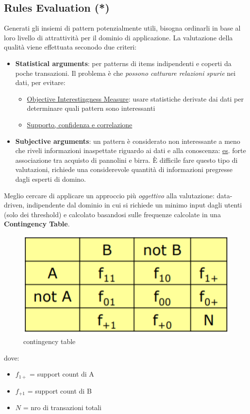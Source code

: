\subsection{Rules Evaluation (*)}
Generati gli insiemi di pattern potenzialmente utili, bisogna ordinarli in base al loro livello di attrattività per il dominio di applicazione. La valutazione della qualità viene effettuata seconodo due criteri:
\begin{itemize}
	\item \textbf{Statistical arguments}: per patterns di items indipendenti e coperti da poche transazioni. Il problema è che \textit{possono catturare relazioni spurie} nei dati, per evitare:
	\begin{itemize}
		\item \underline{Objective Interestingness Measure}: usare statistiche derivate dai dati per determinare quali pattern sono interessanti
		\item \underline{Supporto, confidenza e correlazione}
	\end{itemize}
	\item \textbf{Subjective arguments}: un pattern è considerato non interessante a meno che riveli informazioni inaspettate riguardo ai dati e alla conoscenza: \underline{es}. forte associazione tra acquisto di pannolini e birra. È difficile fare questo tipo di valutazioni, richiede una considerevole quantità di informazioni pregresse dagli esperti di domino.
\end{itemize}

Meglio cercare di applicare un approccio più \textit{oggettivo} alla valutazione: data-driven, indipendente dal dominio in cui si richiede un minimo input dagli utenti (solo dei threshold) e calcolato basandosi sulle frequenze calcolate in una \textbf{Contingency Table}.
\begin{figure}[H]
	\centering
	\includegraphics[height=0.2 \linewidth]{association/pict/contingency_table.png}
	\caption{contingency table}
\end{figure}
dove:
\begin{itemize}
	\item $f_{1+}$ = support count di A
	\item $f_{+1}$ = support count di B
	\item $N$ = nro di transazioni totali
\end{itemize}

